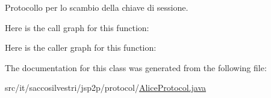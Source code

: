 \-Protocollo per lo scambio della chiave di sessione. 



\-Here is the call graph for this function\-:




\-Here is the caller graph for this function\-:




\-The documentation for this class was generated from the following file\-:\begin{DoxyCompactItemize}
\item 
src/it/saccosilvestri/jsp2p/protocol/\hyperlink{_alice_protocol_8java}{\-Alice\-Protocol.\-java}\end{DoxyCompactItemize}
